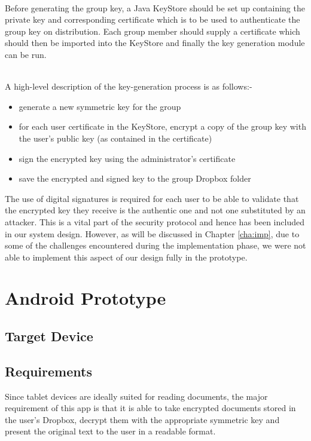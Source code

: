 \\

Before generating the group key, a Java KeyStore should be set up containing the private key and corresponding certificate which is to be used to authenticate the group key on distribution.  Each group member should supply a certificate which should then be imported into the KeyStore and finally the key generation module can be run.  

\\

A high-level description of the key-generation process is as follows:-
\begin{itemize}
\item generate a new  symmetric key for the group
\item for each user certificate in the KeyStore, encrypt a copy of the group key with the user's public key (as contained in the certificate)
\item sign the encrypted key using the administrator's certificate
\item save the encrypted and signed key to the group Dropbox folder 
\end{itemize}

The use of digital signatures is required for each user to be able to validate that the encrypted key they receive is the authentic one and not one substituted by an attacker.  This  is a vital part of the  security protocol and hence has been included in our  system design.  However, as will be discussed in Chapter \ref{cha:imp}, due to some of the challenges encountered during the implementation phase, we were not able to implement this aspect of our design fully in the prototype.


\section{Android Prototype }
\subsection*{Target Device}
\subsection*{Requirements}

Since tablet devices are ideally suited for reading documents, the major requirement of this app is that it is able to take encrypted documents stored in the user's Dropbox,  decrypt them with the appropriate symmetric key and present the original text to the user in a readable format.

